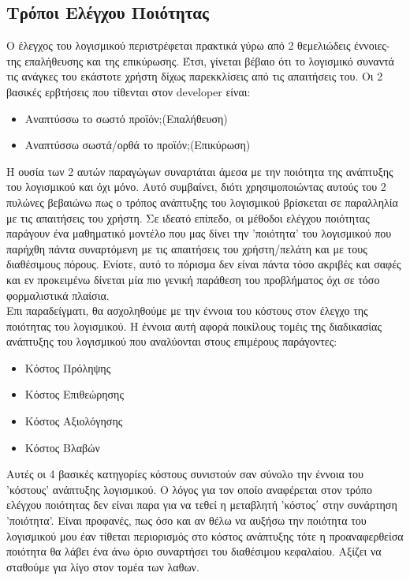 \documentclass[a4paper, 11pt]{article}
\begin{document}
{{\subsection{Tρόποι Ελέγχου Ποιότητας}%
Ο έλεγχος του λογισμικού περιστρέφεται πρακτικά γύρω από 2 θεμελιώδεις έννοιες-της επαλήθευσης και της επικύρωσης. Έτσι, γίνεται βέβαιο ότι το λογισμικό συναντά τις ανάγκες του εκάστοτε χρήστη δίχως παρεκκλίσεις από τις απαιτήσεις του. Οι 2 βασικές ερβτήσεις που τίθενται στον \textlatin{developer} είναι:
\begin{itemize}
\item Αναπτύσσω το σωστό προϊόν\textlatin{;}(Επαλήθευση)
\item Αναπτύσσω σωστά/ορθά το προϊόν\textlatin{;}(Επικύρωση)
\end{itemize}
H ουσία των 2 αυτών παραγώγων συναρτάται άμεσα με την ποιότητα της ανάπτυξης του λογισμικού και όχι μόνο. Αυτό συμβαίνει, διότι χρησιμοποιώντας αυτούς του 2 πυλώνες βεβαιώνω πως ο τρόπος ανάπτυξης του λογισμικού βρίσκεται σε παραλληλία με τις απαιτήσεις του χρήστη. Σε ιδεατό επίπεδο, οι μέθοδοι ελέγχου ποιότητας παράγουν ένα μαθηματικό μοντέλο που μας δίνει την 'ποιότητα' του λογισμικού που παρήχθη πάντα συναρτόμενη με τις απαιτήσεις του χρήστη/πελάτη και με τους διαθέσιμους πόρους. Ενίοτε, αυτό το πόρισμα δεν είναι πάντα τόσο ακριβές και σαφές και εν προκειμένω δίνεται μία πιο γενική παράθεση του προβλήματος όχι σε τόσο φορμαλιστικά πλαίσια. \\
Επι παραδείγματι, θα ασχοληθούμε με την έννοια του κόστους στον έλεγχο της ποιότητας του λογισμικού. Η έννοια αυτή αφορά ποικίλους τομέις της διαδικασίας ανάπτυξης του λογισμικού που αναλύονται στους επιμέρους παράγοντες:
\begin{itemize}
\item Kόστος Πρόληψης 
\item Κόστος Επιθεώρησης
\item Κόστος Αξιολόγησης
\item Κόστος Βλαβών
\end{itemize}
Αυτές οι 4 βασικές κατηγορίες κόστους συνιστούν σαν σύνολο την έννοια του 'κόστους' ανάπτυξης λογισμικού. Ο λόγος για τον οποίο αναφέρεται στον τρόπο ελέγχου ποιότητας δεν είναι παρα για να τεθεί η μεταβλητή 'κόστος΄ στην συνάρτηση 'ποιότητα'.
Είναι προφανές, πως όσο και αν θέλω να αυξήσω την ποιότητα του λογισμικού μου έαν τίθεται περιορισμός στο κόστος ανάπτυξης τότε η προαναφερθείσα ποιότητα θα λάβει ένα άνω όριο συναρτήσει του διαθέσιμου κεφαλαίου. Αξίζει να σταθούμε για λίγο στον τομέα των λαθων.


}}
\end{document}

